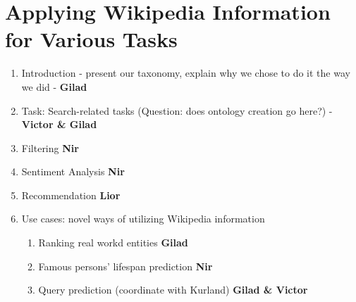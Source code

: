 \chapter{Applying Wikipedia Information for Various Tasks}

\begin{enumerate}
	\item Introduction - present our taxonomy, explain why we chose to do it the way we did - \textbf{Gilad}
	\item Task: Search-related tasks (Question: does ontology creation go here?) - \textbf{Victor \& Gilad}
	\item Filtering \textbf{Nir}
	\item Sentiment Analysis \textbf{Nir}
	\item Recommendation \textbf{Lior}
	\item Use cases: novel ways of utilizing Wikipedia information
	\begin{enumerate}
		\item Ranking real workd entities \textbf{Gilad}
		\item Famous persons' lifespan prediction \textbf{Nir}
		\item Query prediction (coordinate with Kurland) \textbf{Gilad \& Victor}
	\end{enumerate}
\end{enumerate}